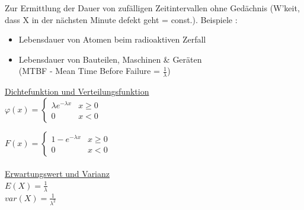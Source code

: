 		Zur Ermittlung der Dauer von zufälligen Zeitintervallen ohne Gedächnis
		(W'keit, dass X in der nächsten Minute defekt geht = const.). Beispiele :
		\begin{itemize}
          \item Lebensdauer von Atomen beim radioaktiven Zerfall
          \item Lebensdauer von Bauteilen, Maschinen \& Geräten\\(MTBF -
          Mean Time Before Failure = $\frac{1}{\lambda}$)
        \end{itemize}
        
		\underline{Dichtefunktion und Verteilungsfunktion}\\
        $\varphi(x)=\begin{cases}
		\lambda e^{-\lambda x}  & x \geq 0\\
  		0						& x < 0
		\end{cases}$
		
		$F(x)=\begin{cases}
  		1-e^{-\lambda x}  		& x \geq 0\\
  		0	 					& x < 0
		\end{cases}$\\ \\

		\underline{Erwartungswert und Varianz}\\
		$E(X)=\frac{1}{\lambda}$\\
		$var(X)=\frac{1}{\lambda^2}$ \\
		
		
\newpage
